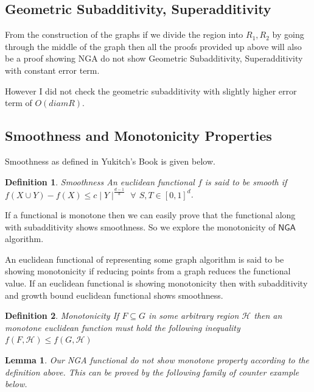 \documentclass{article}
\theoremstyle{define}
\newtheorem{define}{Definition}[section]
\newtheorem{lemma}[theorem]{Lemma}
\theoremstyle{remark}
\begin{document}

\subsection{Geometric Subadditivity, Superadditivity}
From the construction of the graphs if we divide the region into $R_1, R_2$ by going through
the middle of the graph then all the proofs provided up above will also be a proof showing
\textsf{NGA} do not show Geometric Subadditivity, Superadditivity with constant error term.

However I did not check the geometric subadditivity with slightly higher error term of $O(diamR)$.

\subsection{Smoothness and Monotonicity Properties}

Smoothness as defined in Yukitch's Book is given below.

\begin{define}{Smoothness}
    \textit{An euclidean functional $f$ is said to be smooth if $f(X \cup Y) - f(X)\leq c\mid Y\mid^{\frac{d-1}{d}}$
        $\forall$ $S, T \in \left[0,1 \right]^d$}.
\end{define}

If a functional is monotone then we can easily prove that the functional along
with subadditivity shows smoothness. So we explore the monotonicity of
$\textsf{NGA}$ algorithm.

An euclidean functional of representing some graph algorithm is said to be showing monotonicity if reducing points from a graph reduces the functional value.
If an euclidean functional is showing monotonicity then with subadditivity and growth bound euclidean functional shows smoothness.

\begin{define}{Monotonicity}
    \textit{If $F \subseteq G$ in some arbitrary region $\mathcal{H}$ then an monotone euclidean function
    must hold the following inequality $f(F, \mathcal{H}) \leq f(G, \mathcal{H})$}
\end{define}

\begin{lemma}
    Our \textsf{NGA} functional do not show monotone property according to the definition above. This can be proved
    by the following family of counter example below.
\end{lemma}
\end{document}
